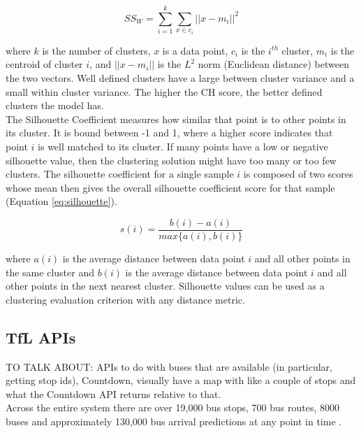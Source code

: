 \documentclass[12pt, a4paper]{article}
\begin{document}
\begin{equation}
    SS_W = \sum_{i=1}^k\sum_{x\in c_i} ||x-m_i|| ^ 2
    \label{eq:ssw}
\end{equation}
 
where $k$ is the number of clusters, $x$ is a data point, $c_i$ is the $i^{th}$ cluster, $m_i$ is the centroid of cluster $i$, and $||x-m_i||$ is the $L^2$ norm (Euclidean distance) between the two vectors. Well defined clusters have a large between cluster variance and a small within cluster variance. The higher the CH score, the better defined clusters the model has. \\

The Silhouette Coefficient \cite{silhouette-score} measures how similar that point is to other points in its cluster. It is bound between -1 and 1, where a higher score indicates that point $i$ is well matched to its cluster. If many points have a low or negative silhouette value, then the clustering solution might have too many or too few clusters. The silhouette coefficient for a single sample $i$ is composed of two scores whose mean then gives the overall silhouette coefficient score for that sample (Equation \ref{eq:silhouette}). 

\begin{equation}
    s(i) = \frac{b(i) - a(i)}{max\{a(i), b(i)\}}
    \label{eq:silhouette}
\end{equation}

where $a(i)$ is the average distance between data point $i$ and all other points in the same cluster and $b(i)$ is the average distance between data point $i$ and all other points in the next nearest cluster. Silhouette values can be used as a clustering evaluation criterion with any distance metric.

\clearpage

\subsection{TfL APIs}

TO TALK ABOUT: APIs to do with buses that are available (in particular, getting stop ids), Countdown, visually have a map with like a couple of stops and what the Countdown API returns relative to that. \\

Across the entire system there are over 19,000 bus stops, 700 bus routes, 8000 buses and approximately 130,000 bus arrival predictions at any point in time \cite{tfl-bus-documentation}.
\end{document}
